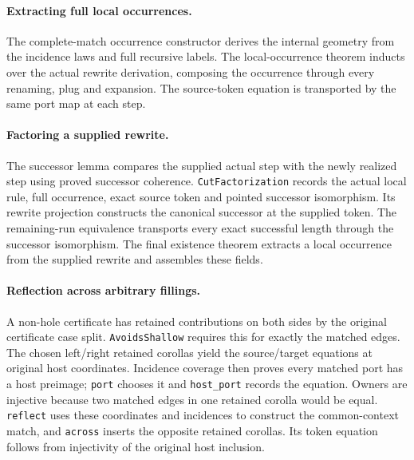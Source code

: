 \paragraph{Extracting full local occurrences.}
The complete-match occurrence constructor derives the internal geometry
from the incidence laws and full recursive labels. The local-occurrence
theorem inducts over the actual rewrite derivation, composing the occurrence
through every renaming, plug and expansion. The source-token equation is
transported by the same port map at each step.


\paragraph{Factoring a supplied rewrite.}
The successor lemma compares the supplied actual step with the newly
realized step using proved successor coherence. \texttt{CutFactorization}
records the actual local rule, full occurrence, exact source token and
pointed successor isomorphism. Its rewrite projection constructs the
canonical successor at the supplied token. The remaining-run equivalence
transports every exact successful length through the successor isomorphism.
The final existence theorem extracts a local occurrence from the supplied
rewrite and assembles these fields.

\par{}

\paragraph{Reflection across arbitrary fillings.}
A non-hole certificate has retained contributions on both sides by the
original certificate case split. \texttt{AvoidsShallow} requires this for
exactly the matched edges. The chosen left/right retained corollas yield
the source/target equations at original host coordinates. Incidence coverage
then proves every matched port has a host preimage; \texttt{port} chooses it
and \texttt{host\_port} records the equation. Owners are injective because
two matched edges in one retained corolla would be equal. \texttt{reflect}
uses these coordinates and incidences to construct the common-context
match, and \texttt{across} inserts the opposite retained corollas. Its token
equation follows from injectivity of the original host inclusion.

